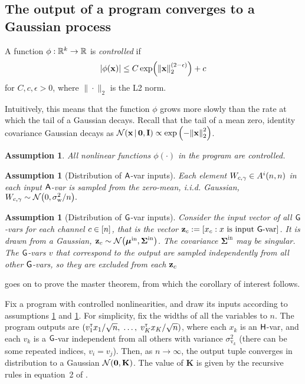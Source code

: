 \documentclass[tablecaption=bottom,wcp,nonatbib]{jmlr} %
\newtheorem{assumption}[theorem]{Assumption}
\newcommand{\vK}{\mathbf{K}}
\newcommand{\vSigma}{\boldsymbol{\Sigma}}
\newcommand{\eye}{\mathbf{I}}
\newcommand{\tp}{{\mathrm{\textsf{\tiny T}}}}
\newcommand{\vbar}{{\,|\,}}
\newcommand{\bracket}[3]{{\left#1 #3 \right#2}}
\newcommand{\bra}{\bracket{(}{)}}
\newcommand{\abs}{\bracket{|}{|}}
\begin{document}
{\subsection{The output of a \Netsor program converges to a Gaussian process}
\begin{definition}
  A function $\phi: \mathbb{R}^k \to \mathbb{R}$ is \emph{controlled} if
  \[ \abs{\phi(\vx)} \le C\, \text{exp} \bra{\bracket{\|}{\|}{\vx}_2^\bra{2-\epsilon}}
    + c \]
  for 
  $C,c,\epsilon > 0$, where $\|\cdot\|_2$ is the L2 norm.\end{definition}

Intuitively, this means that the function $\phi$ grows
more slowly than the rate at which the tail of a Gaussian decays. Recall that the tail of a
mean zero, identity covariance Gaussian decays as 
$\mathcal{N}\bra{\vx \vbar {\boldsymbol{0}}, \eye} \propto \exp\bra{-\bracket{\|}{\|}{\vx}_2^2}$.

\begin{assumption}
  All nonlinear functions $\phi(\cdot)$ in the \Netsor program are controlled.
  \label{ass:controlled}
\end{assumption}

\begin{assumption}[Distribution of $\mathsf{A}$-var inputs]
  Each element $W_{c,\gamma} \in A^i(n, n)$ in each input $\mathsf{A}$-var is
  sampled from the zero-mean, i.i.d. Gaussian, $W_{\chan,\prevchan} \sim \NormDist{0,
    \sigma_\text{w}^2/n}.$
  \label{ass:avar-inputs}
\end{assumption}
\begin{assumption}[Distribution of $\mathsf{G}$-var inputs]
  Consider the input vector of all $\mathsf{G}$-vars for each channel $c \in [n]$,
  that is the vector $\mathbf{z}_c := [x_c : x\text{ is input
  }\mathsf{G}\text{-var}]$. It is drawn from a Gaussian, $\vz_\chan \sim
  \NormDist{\vmu^\text{in}, \vSigma^\text{in}}$.
  The covariance $\vSigma^\text{in}$ may be
  singular. The $\mathsf{G}$-vars $v$ that correspond to the output are sampled
  independently from all other $\mathsf{G}$-vars, so they are excluded from each $\mathbf{z}_c$
  \label{ass:gvar-inputs}
\end{assumption}

\citet{yang2019wide} goes on to prove the \Netsor master theorem, from which
the corollary of interest follows.

\begin{corollary}
  Fix a \Netsor program with controlled nonlinearities, and draw its inputs
  according to assumptions \ref{ass:avar-inputs} and \ref{ass:gvar-inputs}. For simplicity, fix
  the widths of all the variables to $n$. The program outputs are $(v_{1}^\tp x_1/\sqrt{n}, \;\dots, \; v_K^\tp
  x_K/\sqrt{n})$, where
  each $x_k$ is an $\mathsf{H}$-var, and each
    $v_k$ is a $\mathsf{G}$-var independent from all others with variance
    $\sigma^2_{\text{v}_k}$ (there can be some repeated indices, $v_i = v_j$).
  Then, as $n \to \infty$, the output tuple
  converges in distribution to a Gaussian $\NormDist{{\boldsymbol{0}}, \vK}$.
  The value of $\vK$ is given by the recursive rules in equation~2 of \citet{yang2019wide}.
  \label{corollary:netsor-gp}
\end{corollary}

}
\end{document}
